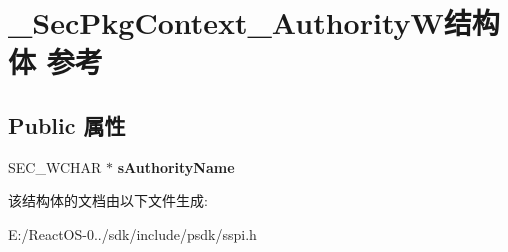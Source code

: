 \hypertarget{struct___sec_pkg_context___authority_w}{}\section{\+\_\+\+Sec\+Pkg\+Context\+\_\+\+Authority\+W结构体 参考}
\label{struct___sec_pkg_context___authority_w}
\subsection*{Public 属性}
\begin{DoxyCompactItemize}
\item 
\mbox{\label{struct___sec_pkg_context___authority_w_aa5148bbfefeeca39d88277f0b716d157}} 
S\+E\+C\+\_\+\+W\+C\+H\+AR $\ast$ {\bfseries s\+Authority\+Name}
\end{DoxyCompactItemize}


该结构体的文档由以下文件生成\+:\begin{DoxyCompactItemize}
\item 
E\+:/\+React\+O\+S-\/0../sdk/include/psdk/sspi.\+h\end{DoxyCompactItemize}
